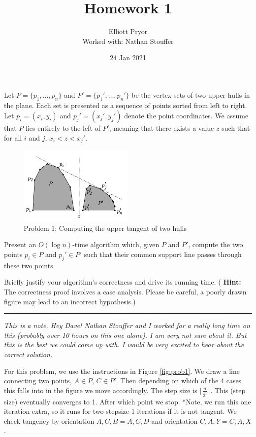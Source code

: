 \documentclass[11pt]{article}
\title{Homework 1}
\author{Elliott Pryor\\
Worked with: Nathan Stouffer}
\date{24 Jan 2021}
\begin{document}
\maketitle

Let $P = \{ p_1, \ldots, p_n \}$ and $P' = \{ p_1', \ldots, p_n' \}$ be the
vertex sets of two upper hulls in the plane.  Each set is presented as a
sequence of points sorted from left to right.  Let $p_i = (x_i, y_i)$ and $p_j'
= (x_j', y_j')$ denote the point coordinates.  We assume that $P$ lies entirely
to the left of $P'$, meaning that there exists a value $z$ such that for all
$i$ and $j$, $x_i < z < x_j'$.

\begin{figure}[h]
    \centering
    \includegraphics[width=0.5\textwidth]{tangents}
    \caption{Problem 1: Computing the upper tangent of two hulls}
\end{figure}

Present an $O(\log n)$-time algorithm which, given $P$ and $P'$, compute the two
points $p_i \in P$ and $p_j' \in P'$ such that their common support line passes
through these two points.

Briefly justify your algorithm's correctness and drive its running time.  ({\bf
Hint:} The correctness proof involves a case analysis.  Please be careful, a
poorly drawn figure may lead to an incorrect hypothesis.)
\hrule
\emph{
    This is a note. Hey Dave! Nathan Stouffer and I worked for a really long time on this (probably over 10 hours on this one alone). 
    I am very not sure about it. But this is the best we could come up with. 
    I would be very excited to hear about the correct solution. 
}

For this problem, we use the instructions in Figure \ref{fig:prob1}. We draw a line connecting two points, $A \in P$, $C \in P'$.
Then depending on which of the 4 cases this falls into in the figure we move accordingly. 
The step size is $\lceil \frac{n}{2^i} \rceil$. This (step size) eventually converges to 1. After which point we stop.
*Note, we run this one iteration extra, so it runs for two stepsize 1 iterations if it is not tangent.
We check tangency by orientation $A,C,B = A,C,D$ and orientation $C,A,Y= C,A,X$.
\end{document}
